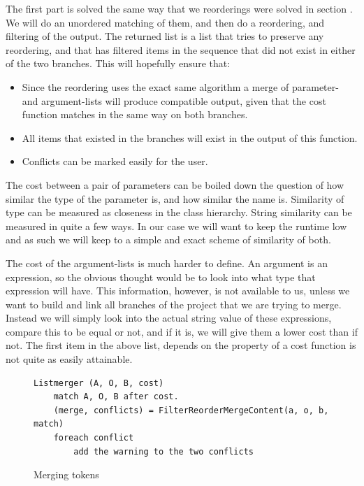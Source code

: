 \documentclass[11pt]{article}
\begin{document}
The first part is solved the same way that we reorderings were solved in section . We will do an unordered matching of them, and then do a reordering, and filtering of the output. The returned list is a list that tries to preserve any reordering, and that has filtered items in the sequence that did not exist in either of the two branches. This will hopefully ensure that:

\begin{itemize}
	\item Since the reordering uses the exact same algorithm a merge of parameter- and argument-lists will produce compatible output, given that the cost function matches in the same way on both branches.
	\item All items that existed in the branches will exist in the output of this function. 
	\item Conflicts can be marked easily for the user.
\end{itemize}

The cost between a pair of parameters can be boiled down the question of how similar the type of the parameter is, and how similar the name is. Similarity of type can be measured as closeness in the class hierarchy. String similarity can be measured in quite a few ways. In our case we will want to keep the runtime low and as such we will keep to a simple and exact scheme of similarity of both.

The cost of the argument-lists is much harder to define. An argument is an expression, so the obvious thought would be to look into what type that expression will have. This information, however, is not available to us, unless we want to build and link all branches of the project that we are trying to merge. Instead we will simply look into the actual string value of these expressions, compare this to be equal or not, and if it is, we will give them a lower cost than if not.
The first item in the above list, depends on the property of a cost function is not quite as easily attainable. 


\begin{figure}
  \caption{Merging tokens}
  \label{MergeToken}
\begin{verbatim}
Listmerger (A, O, B, cost)
    match A, O, B after cost.
    (merge, conflicts) = FilterReorderMergeContent(a, o, b, match)
    foreach conflict
        add the warning to the two conflicts

\end{verbatim}
\end{figure}
\end{document}
